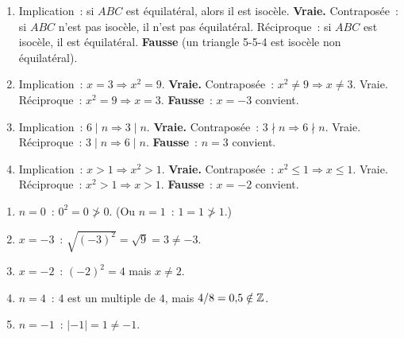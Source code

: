
\begin{enumerate}
  \item Implication~: si $ABC$ est \'equilat\'eral, alors il est isoc\`ele.
        \textbf{Vraie.} Contrapos\'ee~: si $ABC$ n'est pas isoc\`ele, il n'est pas \'equilat\'eral.
        R\'eciproque~: si $ABC$ est isoc\`ele, il est \'equilat\'eral. \textbf{Fausse}
        (un triangle 5-5-4 est isoc\`ele non \'equilat\'eral).
  \item Implication~: $x=3\Rightarrow x^2=9$. \textbf{Vraie.}
        Contrapos\'ee~: $x^2\ne9\Rightarrow x\ne3$. Vraie.
        R\'eciproque~: $x^2=9\Rightarrow x=3$. \textbf{Fausse}~: $x=-3$ convient.
  \item Implication~: $6\mid n\Rightarrow3\mid n$. \textbf{Vraie.}
        Contrapos\'ee~: $3\nmid n\Rightarrow6\nmid n$. Vraie.
        R\'eciproque~: $3\mid n\Rightarrow6\mid n$. \textbf{Fausse}~: $n=3$ convient.
  \item Implication~: $x>1\Rightarrow x^2>1$. \textbf{Vraie.}
        Contrapos\'ee~: $x^2\leq1\Rightarrow x\leq1$. Vraie.
        R\'eciproque~: $x^2>1\Rightarrow x>1$. \textbf{Fausse}~: $x=-2$ convient.
\end{enumerate}


\begin{enumerate}
  \item $n=0$~: $0^2=0\not>0$. (Ou $n=1$~: $1=1\not>1$.)
  \item $x=-3$~: $\sqrt{(-3)^2}=\sqrt{9}=3\ne-3$.
  \item $x=-2$~: $(-2)^2=4$ mais $x\ne2$.
  \item $n=4$~: $4$ est un multiple de $4$, mais $4/8=0{,}5\notin\mathbb{Z}$.
  \item $n=-1$~: $|-1|=1\ne-1$.
\end{enumerate}


